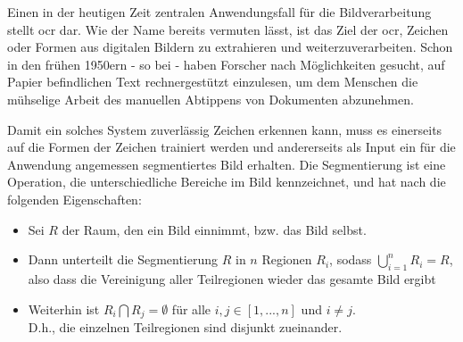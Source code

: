 	Einen in der heutigen Zeit zentralen Anwendungsfall für die Bildverarbeitung stellt \gls{ocr} dar. Wie der Name bereits vermuten lässt, ist das Ziel der \gls{ocr}, Zeichen oder Formen aus digitalen Bildern zu extrahieren und weiterzuverarbeiten. Schon in den frühen 1950ern - so bei \cite{cher-et-al-ocr} - haben Forscher nach Möglichkeiten gesucht, auf Papier befindlichen Text rechnergestützt einzulesen, um dem Menschen die mühselige Arbeit des manuellen Abtippens von Dokumenten abzunehmen.
	
	

	Damit ein solches System zuverlässig Zeichen erkennen kann, muss es einerseits auf die Formen der Zeichen trainiert werden und andererseits als Input ein für die Anwendung angemessen segmentiertes Bild erhalten. Die Segmentierung ist eine Operation, die unterschiedliche Bereiche im Bild kennzeichnet, und hat nach \cite[S. 690 f]{gonzalez-woods}
	die folgenden Eigenschaften:
	\begin{itemize}
		\item Sei $R$ der Raum, den ein Bild einnimmt, bzw. das Bild selbst.
		\item Dann unterteilt die Segmentierung $R$ in $n$ Regionen $R_{i}$, sodass $\bigcup\limits_{i=1}^{n} R_{i} = R$, also dass die Vereinigung aller Teilregionen wieder das gesamte Bild ergibt
		\item Weiterhin ist $R_{i} \bigcap R_{j} = \emptyset $ für alle $i, j \in [1, ... , n]$ und $i \neq j$. \\
		D.h., die einzelnen Teilregionen sind disjunkt zueinander.
	\end{itemize}
		